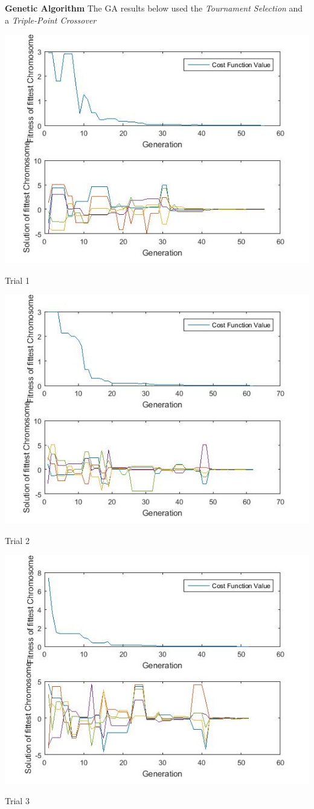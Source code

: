 \documentclass{article}
\begin{document}
\textbf{Genetic Algorithm} The GA results below used the \textit{Tournament Selection} and a \textit{Triple-Point Crossover}\\
\centerline{\includegraphics[width=0.5\linewidth]{ga_tf2_s1_c2a}}
\centerline{Trial 1}
\centerline{\includegraphics[width=0.5\linewidth]{ga_tf2_s1_c2b}}
\centerline{Trial 2}
\centerline{\includegraphics[width=0.5\linewidth]{ga_tf2_s1_c2c}}
\centerline{Trial 3}
\end{document}
